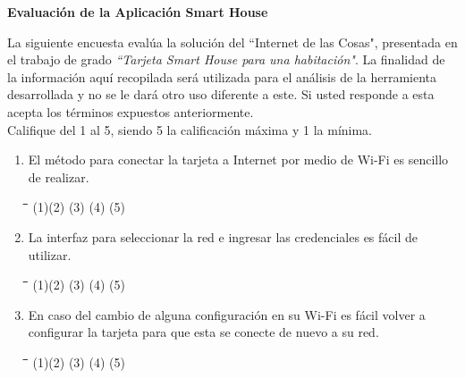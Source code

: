 \begin{appendix}
\textbf{Evaluación de la Aplicación Smart House\\}

La siguiente encuesta evalúa la solución del ``Internet de las Cosas", presentada en el trabajo de grado \textit{``Tarjeta Smart House para una habitación"}. La finalidad de la información aquí recopilada será utilizada para el análisis de la herramienta desarrollada y no se le dará otro uso diferente a este. Si usted responde a esta acepta los términos expuestos anteriormente.\\

Califique del 1 al 5, siendo 5 la calificación máxima y 1 la mínima.\\

\begin{enumerate}
	\item El método para conectar la tarjeta a Internet por medio de Wi-Fi es sencillo de realizar.
		
\begin{tabbing}
	\hspace{2cm}\=\hspace{2cm}\=\hspace{2cm}\=\hspace{2cm}\=\kill
	(1)\>(2)  \>(3)  \>(4)  \>(5) 
\end{tabbing} 
		
	\item La interfaz para seleccionar la red e ingresar las credenciales es fácil de utilizar. 
	
	\begin{tabbing}
		\hspace{2cm}\=\hspace{2cm}\=\hspace{2cm}\=\hspace{2cm}\=\kill
		(1)\>(2)  \>(3)  \>(4)  \>(5) 
	\end{tabbing} 

	\item En caso del cambio de alguna configuración en su Wi-Fi es fácil volver a configurar la tarjeta para que esta se conecte de nuevo a su red.
	
	\begin{tabbing}
		\hspace{2cm}\=\hspace{2cm}\=\hspace{2cm}\=\hspace{2cm}\=\kill
		(1)\>(2)  \>(3)  \>(4)  \>(5) 
	\end{tabbing} 


\end{enumerate}
\end{appendix}
